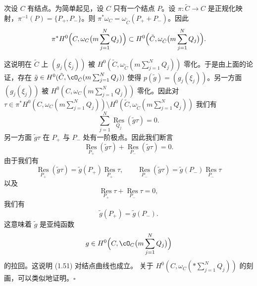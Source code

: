 次设 $C$ 有结点。为简单起见，设 $C$ 只有一个结点 $P$。设 $\pi:\tilde C\to C$ 是正规化映射，$\pi^{-1}(P)=\{P_+,P_-\}$。则 $\pi^\ast\omega_C=\omega_{\tilde C}(P_++P_-)$。因此
\[
\pi^\ast H^0\Bigl(C,\omega_C\bigl(m\sum_{j=1}^N Q_j\bigr)\Bigr)\subset H^0\Bigl(\tilde C,\omega_{\tilde C}\bigl(m\sum_{j=1}^N Q_j\bigr)\Bigr).
\]

这说明在 $\tilde C$ 上 $(g_j(\xi_j))$ 被 $H^0(\tilde C,\omega_{\tilde C}(m\sum_{j=1}^N Q_j))$ 零化。于是由上面的论证，存在 $\tilde g\in H^0(\tilde C,\cO_{\tilde C}(m\sum_{j=1}^N Q_j))$ 使得 $p(\tilde g)=(g_j(\xi_j))$。另一方面 $(g_j(\xi_j))$ 被 $H^0(C,\omega_C(m\sum_{j=1}^N Q_j))$ 零化。因此对 $\tau\in\pi^\ast H^0(C,\omega_C(m\sum_{j=1}^N Q_j))\setminus H^0(\tilde C,\omega_{\tilde C}(m\sum_{j=1}^N Q_j))$ 我们有
\[
\sum_{j=1}^N\operatorname*{Res}_{Q_j}(\tilde g\tau)=0 .
\]
另一方面 $\tilde g\tau$ 在 $P_+$ 与 $P_-$ 处有一阶极点。因此我们断言
\begin{equation}
\operatorname*{Res}_{P_+}(\tilde g\tau)+\operatorname*{Res}_{P_-}(\tilde g\tau)=0 . \tag{1.52}
\end{equation}
由于我们有
\[
\operatorname*{Res}_{P_+}(\tilde g\tau)=\tilde g(P_+)\operatorname*{Res}_{P_+}\tau,\qquad
\operatorname*{Res}_{P_-}(\tilde g\tau)=\tilde g(P_-)\operatorname*{Res}_{P_-}\tau
\]
以及
\[
\operatorname*{Res}_{P_+}\tau+\operatorname*{Res}_{P_-}\tau=0 ,
\]
我们有
\[
\tilde g(P_+)=\tilde g(P_-) .
\]
这意味着 $\tilde g$ 是亚纯函数
\[
g\in H^0\Bigl(C,\cO_C\bigl(m\sum_{j=1}^N Q_j\bigr)\Bigr)
\]
的拉回。这说明 (1.51) 对结点曲线也成立。
关于 $H^0(C,\omega_C(\ast\sum_{j=1}^N Q_j))$ 的刻画，可以类似地证明。\hfill$\square$

